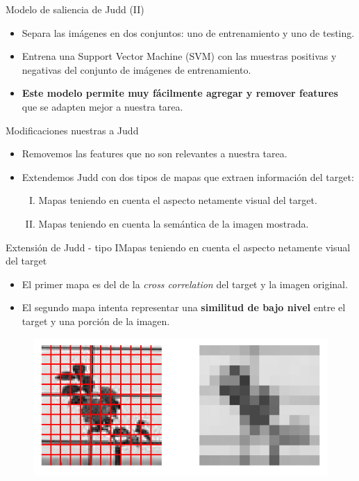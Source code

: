 \documentclass[compress]{beamer}
\begin{document}
\begin{frame}{Modelo de saliencia de Judd (II)}
\begin{itemize}

\item Separa las imágenes en dos conjuntos: uno de entrenamiento y uno de testing. 
\item Entrena una Support Vector Machine (SVM) con las muestras positivas y negativas del conjunto de imágenes de entrenamiento.
\item \textbf{Este modelo permite muy fácilmente agregar y remover features} que se adapten mejor a nuestra tarea.
\end{itemize}
\end{frame}

\begin{frame}{Modificaciones nuestras a Judd}
\begin{itemize}
\item Removemos las features que no son relevantes a nuestra tarea.
\bigskip
\item Extendemos Judd con dos tipos de mapas que extraen información del target:
\begin{enumerate}[I.]
\item Mapas teniendo en cuenta el aspecto netamente visual del target.
\item Mapas teniendo en cuenta la semántica de la imagen mostrada.
\end{enumerate}
\end{itemize}
\end{frame}

\begin{frame}{Extensión de Judd - tipo I}{Mapas teniendo en cuenta el aspecto netamente visual del target}

\begin{itemize}
\item El primer mapa es del de la \textit{cross correlation} del target y la imagen original.
\item El segundo mapa intenta representar una \textbf{similitud de bajo nivel} entre el target y una porción de la imagen.
\end{itemize}

\begin{figure}
\includegraphics[width=0.7\linewidth]{images/grilla-gorda.png} 
\end{figure}

\end{frame}
\end{document}
